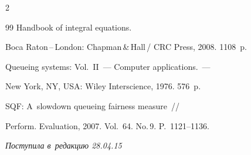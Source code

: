 \begin{multicols}{2}
{{\begin{thebibliography}{99}
Handbook of integral equations.


 Boca Raton\,--\,London: Chapman\,\&\,Hall\,/ CRC Press, 2008. 1108~p.










 Queueing systems: Vol.~II~--- Computer applications.~---


New York, NY, USA: Wiley Interscience, 1976. 576~p.









SQF: A~slowdown queueing fairness measure~//


Perform. Evaluation, 2007. Vol.~64. No.\,9. P.~1121--1136.


 \end{thebibliography}





 }


 }





\end{multicols}





\vspace*{-3pt}





\hfill{\small\textit{Поступила в~редакцию 28.04.15}}





\newpage

























